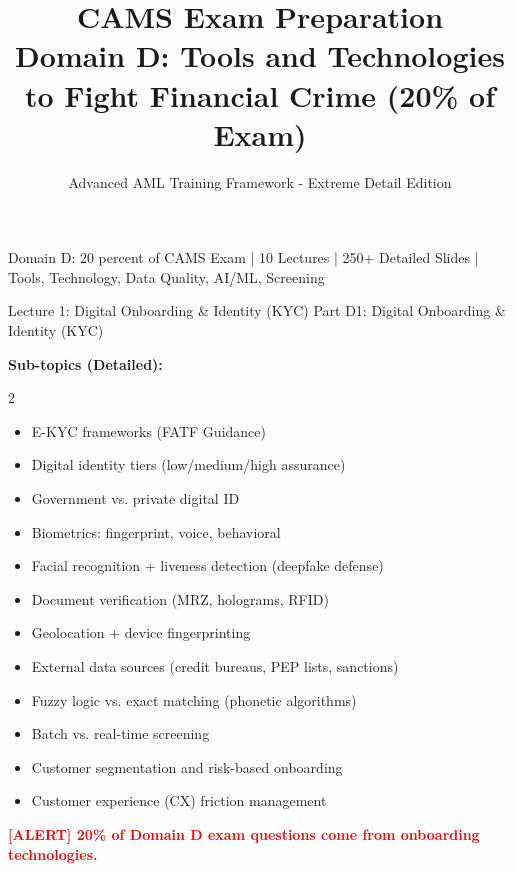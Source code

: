 \documentclass[11pt,a4paper]{beamer}
\title[CAMS Domain D - ULTRA DETAILED]{CAMS Exam Preparation\\Domain D: Tools and Technologies\\to Fight Financial Crime (20\% of Exam)}
\author{Advanced AML Training Framework - Extreme Detail Edition}
\date{}
\renewcommand{\tiny}{\fontsize{5pt}{6pt}\selectfont}
\newcommand{\redflag}[1]{\textcolor{red}{\textbf{[ALERT] #1}}}
\begin{document}
\begin{frame}
	\titlepage
	\centering
	\tiny Domain D: 20 percent of CAMS Exam | 10 Lectures | 250+ Detailed Slides | Tools, Technology, Data Quality, AI/ML, Screening
\end{frame}


\begin{frame}{Lecture 1: Digital Onboarding \& Identity (KYC)}
	\centering
	\Large Part D1: Digital Onboarding \& Identity (KYC)
	\vspace{0.3cm}
	
	\textbf{Sub-topics (Detailed):}
	\begin{multicols}{2}
		\begin{itemize}
			\item E-KYC frameworks (FATF Guidance)
			\item Digital identity tiers (low/medium/high assurance)
			\item Government vs. private digital ID
			\item Biometrics: fingerprint, voice, behavioral
			\item Facial recognition + liveness detection (deepfake defense)
			\item Document verification (MRZ, holograms, RFID)
			\item Geolocation + device fingerprinting
			\item External data sources (credit bureaus, PEP lists, sanctions)
			\item Fuzzy logic vs. exact matching (phonetic algorithms)
			\item Batch vs. real-time screening
			\item Customer segmentation and risk-based onboarding
			\item Customer experience (CX) friction management
		\end{itemize}
	\end{multicols}
	\redflag{20\% of Domain D exam questions come from onboarding technologies.}
\end{frame}
\end{document}
